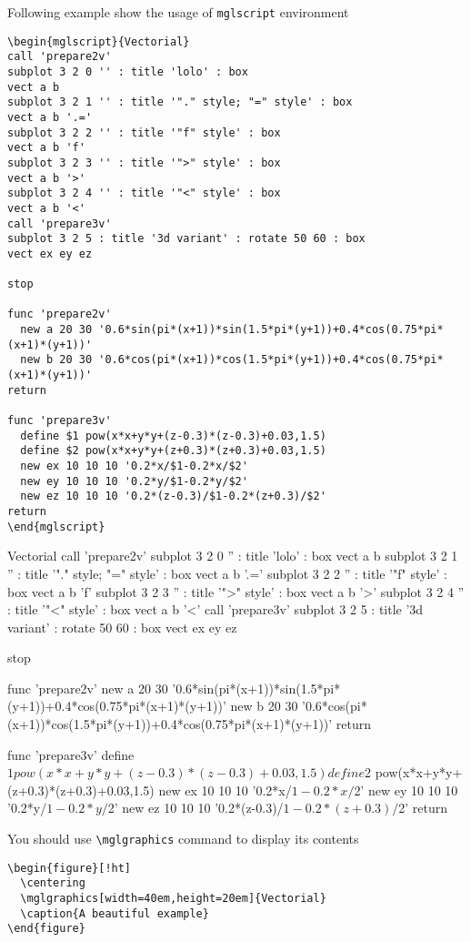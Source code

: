 \documentclass[12pt]{article}
\begin{document}
Following example show the usage of \texttt{mglscript} environment
\begin{verbatim}
\begin{mglscript}{Vectorial}
call 'prepare2v'
subplot 3 2 0 '' : title 'lolo' : box
vect a b
subplot 3 2 1 '' : title '"." style; "=" style' : box
vect a b '.='
subplot 3 2 2 '' : title '"f" style' : box
vect a b 'f'
subplot 3 2 3 '' : title '">" style' : box
vect a b '>'
subplot 3 2 4 '' : title '"<" style' : box
vect a b '<'
call 'prepare3v'
subplot 3 2 5 : title '3d variant' : rotate 50 60 : box
vect ex ey ez

stop
    
func 'prepare2v'
  new a 20 30 '0.6*sin(pi*(x+1))*sin(1.5*pi*(y+1))+0.4*cos(0.75*pi*(x+1)*(y+1))'
  new b 20 30 '0.6*cos(pi*(x+1))*cos(1.5*pi*(y+1))+0.4*cos(0.75*pi*(x+1)*(y+1))'
return
    
func 'prepare3v'
  define $1 pow(x*x+y*y+(z-0.3)*(z-0.3)+0.03,1.5)
  define $2 pow(x*x+y*y+(z+0.3)*(z+0.3)+0.03,1.5)
  new ex 10 10 10 '0.2*x/$1-0.2*x/$2'
  new ey 10 10 10 '0.2*y/$1-0.2*y/$2'
  new ez 10 10 10 '0.2*(z-0.3)/$1-0.2*(z+0.3)/$2'
return
\end{mglscript}
\end{verbatim}

\begin{mglscript}{Vectorial}
call 'prepare2v'
subplot 3 2 0 '' : title 'lolo' : box
vect a b
subplot 3 2 1 '' : title '"." style; "=" style' : box
vect a b '.='
subplot 3 2 2 '' : title '"f" style' : box
vect a b 'f'
subplot 3 2 3 '' : title '">" style' : box
vect a b '>'
subplot 3 2 4 '' : title '"<" style' : box
vect a b '<'
call 'prepare3v'
subplot 3 2 5 : title '3d variant' : rotate 50 60 : box
vect ex ey ez

stop
    
func 'prepare2v'
  new a 20 30 '0.6*sin(pi*(x+1))*sin(1.5*pi*(y+1))+0.4*cos(0.75*pi*(x+1)*(y+1))'
  new b 20 30 '0.6*cos(pi*(x+1))*cos(1.5*pi*(y+1))+0.4*cos(0.75*pi*(x+1)*(y+1))'
return
    
func 'prepare3v'
  define $1 pow(x*x+y*y+(z-0.3)*(z-0.3)+0.03,1.5)
  define $2 pow(x*x+y*y+(z+0.3)*(z+0.3)+0.03,1.5)
  new ex 10 10 10 '0.2*x/$1-0.2*x/$2'
  new ey 10 10 10 '0.2*y/$1-0.2*y/$2'
  new ez 10 10 10 '0.2*(z-0.3)/$1-0.2*(z+0.3)/$2'
return
\end{mglscript}

You should use \texttt{\textbackslash{}mglgraphics} command to display its contents
\begin{verbatim}
\begin{figure}[!ht]
  \centering
  \mglgraphics[width=40em,height=20em]{Vectorial}
  \caption{A beautiful example}
\end{figure}
\end{verbatim}
\end{document}

